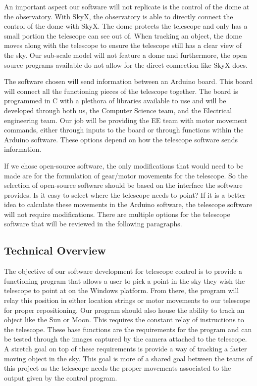 \documentclass[12pt]{report}
\begin{document}
An important aspect our software will not replicate is the control of the dome at the observatory. With SkyX, the observatory is able to directly connect the control of the dome with SkyX. The dome protects the telescope and only has a small portion the telescope can see out of. When tracking an object, the dome moves along with the telescope to ensure the telescope still has a clear view of the sky. Our sub-scale model will not feature a dome and furthermore, the open source programs available do not allow for the direct connection like SkyX does.

The software chosen will send information between an Arduino board. This board will connect all the functioning pieces of the telescope together. The board is programmed in C with a plethora of libraries available to use and will be developed through both us, the Computer Science team, and the Electrical engineering team. Our job will be providing the EE team with motor movement commands, either through inputs to the board or through functions within the Arduino software. These options depend on how the telescope software sends information.

If we chose open-source software, the only modifications that would need to be made are for the formulation of gear/motor movements for the telescope. So the selection of open-source software should be based on the interface the software provides. Is it easy to select where the telescope needs to point? If it is a better idea to calculate these movements in the Arduino software, the telescope software will not require modifications. There are multiple options for the telescope software that will be reviewed in the following paragraphs.

\subsection*{Technical Overview}

The objective of our software development for telescope control is to provide a functioning program that allows a user to pick a point in the sky they wish the telescope to point at on the Windows platform. From there, the program will relay this position in either location strings or motor movements to our telescope for proper repositioning. Our program should also house the ability to track an object like the Sun or Moon. This requires the constant relay of instructions to the telescope. These base functions are the requirements for the program and can be tested through the images captured by the camera attached to the telescope. A stretch goal on top of these requirements is provide a way of tracking a faster moving object in the sky. This goal is more of a shared goal between the teams of this project as the telescope needs the proper movements associated to the output given by the control program.
\end{document}
